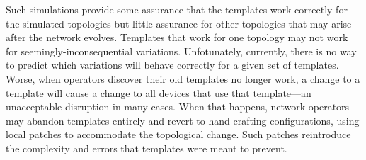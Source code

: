 \documentclass[numbers, 10pt, preprint]{sigplanconf}
\newcommand{\ratul}[1]{\textcolor{blue}{[ratul: #1]}}
\newcommand{\dpw}[1]{\textcolor{tmlblue}{[dpw: #1]}}
\begin{document}


Such simulations provide some assurance that the templates work correctly for the simulated topologies but little assurance for other topologies that may arise after the network evolves. Templates that work for one topology may not work for seemingly-inconsequential variations.  Unfotunately, currently,
there is no way to predict which variations will behave correctly for a given set of templates.
Worse, when operators discover their old templates no longer work, a change to a template will
cause a change to all devices that use that template---an unacceptable disruption in many cases.  When that happens, network operators may abandon templates entirely and revert to hand-crafting configurations, using local patches to accommodate the topological change.
Such patches reintroduce the complexity and errors that templates were meant to prevent.

\end{document}
